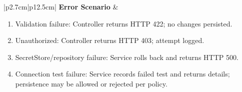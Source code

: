\begin{table}[H]
\begin{tabular}{|p{2.7cm}|p{12.5cm}|}
        \textbf{Error Scenario} & \begin{minipage}[t]{\linewidth}
            \begin{enumerate}[topsep=0pt,itemsep=1pt,parsep=0pt,partopsep=0pt]
                \item Validation failure: Controller returns HTTP 422; no changes persisted.
                \item Unauthorized: Controller returns HTTP 403; attempt logged.
                \item SecretStore/repository failure: Service rolls back and returns HTTP 500.
                \item Connection test failure: Service records failed test and returns details; persistence may be allowed or rejected per policy.
            \end{enumerate}
        \end{minipage} \\ \hline
    \end{tabular}
    \label{tab:admin-manage-connection-preferences}
\end{table}


